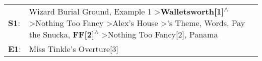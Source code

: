 \begin{supertabular}{p{0.03\textwidth}p{0.92\textwidth}}
 \textbf{S1}:  &  Wizard Burial Ground\textsuperscript{}, \enspace Example 1\textsuperscript{} \textgreater \enspace \textbf{Walletsworth[1]\textsuperscript{$\wedge$}} \textgreater \enspace Nothing Too Fancy\textsuperscript{} \textgreater \enspace Alex's House\textsuperscript{} \textgreater {}'s Theme\textsuperscript{}, \enspace Words\textsuperscript{}, \enspace Pay the Snucka\textsuperscript{}, \enspace \textbf{FF[2]\textsuperscript{$\wedge$}} \textgreater \enspace Nothing Too Fancy[2]\textsuperscript{}, \enspace Panama\textsuperscript{}  \enspace  \\
 \textbf{E1}:  &                                                                                                                                                                                                                                                                                                                                                                                                                                                                                                              Miss Tinkle's Overture[3]\textsuperscript{}  \enspace  \\
\end{supertabular}
